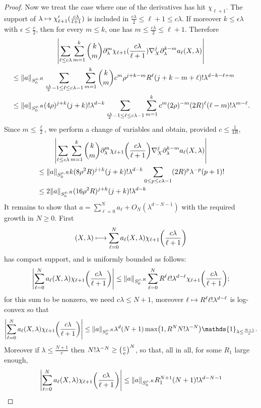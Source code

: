 \documentclass[10pt]{amsart}
\theoremstyle{definition}\newtheorem{defi}[theo]{Definition}\newtheorem{rema}[theo]{Remark}\newtheorem{exam}[theo]{Example}\newtheorem{exem}[theo]{Example}\newtheorem{nota}[theo]{Notation}
\newcommand\1{\mathds{1}}
\let\oldmapsto\mapsto
\renewcommand*{\mapsto}{\mathchoice{\longmapsto}{\oldmapsto}{\oldmapsto}{\oldmapsto}}
\let\originalleft\left
\let\originalright\right
\renewcommand{\left}{\mathopen{}\mathclose\bgroup\originalleft}
\renewcommand{\right}{\aftergroup\egroup\originalright}
\begin{document}
\begin{proof}
Now we treat the case where one of the derivatives has hit $\chi_{\ell+1}$. The support of $\lambda\mapsto
\chi_{\ell+1}'(\frac{c\lambda}{\ell+1})$ is included in $\frac{c\lambda}{2}\leq \ell+1\leq c\lambda$. If moreover $k\leq
\epsilon \lambda$ with $\epsilon \leq \frac{c}{2}$, then for every $m\leq k$, one has $m\leq \frac{c\lambda}{2}\leq \ell+1$. Therefore
\begin{multline*}
\left|\sum_{\ell\leq c\lambda}\sum_{m=1}^{k}\binom{k}{m}\partial_{\lambda}^m\chi_{\ell+1}(\frac{c\lambda}{\ell+1})\nabla^j_X\partial^{k-m}_{\lambda}a_{\ell}(X,\lambda)\right|\\
\begin{aligned}
&\leq\|a\|_{S^{\rho,R}_0}\sum_{\frac{c\lambda}{2}-1\leq\ell\leq c\lambda-1}\sum_{m=1}^k\binom{k}{m}c^m\rho^{j+k-m}R^\ell(j+k-m+\ell)!\lambda^{d-k-\ell+m}\\
&\leq \|a\|_{S^{\rho,R}_0}(4\rho)^{j+k}(j+k)!\lambda^{d-k}\sum_{\frac{c\lambda}{2}-1\leq\ell\leq c\lambda-1}\sum_{m=1}^kc^m(2\rho)^{-m}(2R)^{\ell}(\ell-m)!\lambda^{m-\ell}.
\end{aligned}
\end{multline*}
Since $m\leq \frac{\ell}{2}$, we perform a change of variables and obtain, provided $c\leq\frac{1}{4R}$,
\begin{multline*}
\left|\sum_{\ell\leq c\lambda}\sum_{m=1}^{k}\binom{k}{m}\partial_{\lambda}^m\chi_{\ell+1}\left(\frac{c\lambda}{\ell+1}\right)\nabla^j_X\partial^{k-m}_{\lambda}a_{\ell}(X,\lambda)\right|\\
\begin{aligned}
&\leq
\|a\|_{S^{\rho,R}_0}k(8\rho^2R)^{j+k}(j+k)!\lambda^{d-k}\sum_{0\leq p\leq c\lambda-1}(2R)^p\lambda^{-p}(p+1)!\\
&\leq 2\|a\|_{S^{\rho,R}_0}(16\rho^2R)^{j+k}(j+k)!\lambda^{d-k}
\end{aligned}
\end{multline*}
It remains to show that $a=\sum_{\ell=0}^Na_\ell+O_N(\lambda^{d-N-1})$ with the required growth in $N\geq 0$. First
\[
(X,\lambda)\mapsto\sum_{\ell=0}^Na_\ell(X,\lambda)\chi_{\ell+1}\left(\frac{c\lambda}{\ell+1}\right)
\]
has compact support, and is uniformly bounded as follows:
\[
\left|\sum_{\ell=0}^Na_\ell(X,\lambda)\chi_{\ell+1}\left(\frac{c\lambda}{\ell+1}\right)\right|
\leq
\|a\|_{S^{\rho,R}_0}\sum_{\ell=0}^NR^{\ell}\ell!\lambda^{d-\ell}\chi_{\ell+1}\left(\frac{c\lambda}{\ell+1}\right);
\]
for this sum to be nonzero, we need $c\lambda\leq N+1$, moreover $\ell\mapsto R^{\ell}\ell!\lambda^{d-\ell}$ is log-convex so that
\[
\left|\sum_{\ell=0}^Na_\ell(X,\lambda)\chi_{\ell+1}\left(\frac{c\lambda}{\ell+1}\right)\right|
\leq
\|a\|_{S^{\rho,R}_0}\lambda^d(N+1)\max\left(1,R^NN!\lambda^{-N}\right)\1_{\lambda\leq
\frac{N+1}{c}}.
\]
Moreover if $\lambda\leq \frac{N+1}{c}$ then $N!\lambda^{-N}\geq
\left(\frac{c}{e}\right)^N$, so that, all in all, for some $R_1$ large enough,
\[
\left|\sum_{\ell=0}^Na_\ell(X,\lambda)\chi_{\ell+1}\left(\frac{c\lambda}{\ell+1}\right)\right|
\leq
\|a\|_{S^{\rho,R}_0}R_1^{N+1}(N+1)!\lambda^{d-N-1}
\]


\end{proof}
\end{document}
